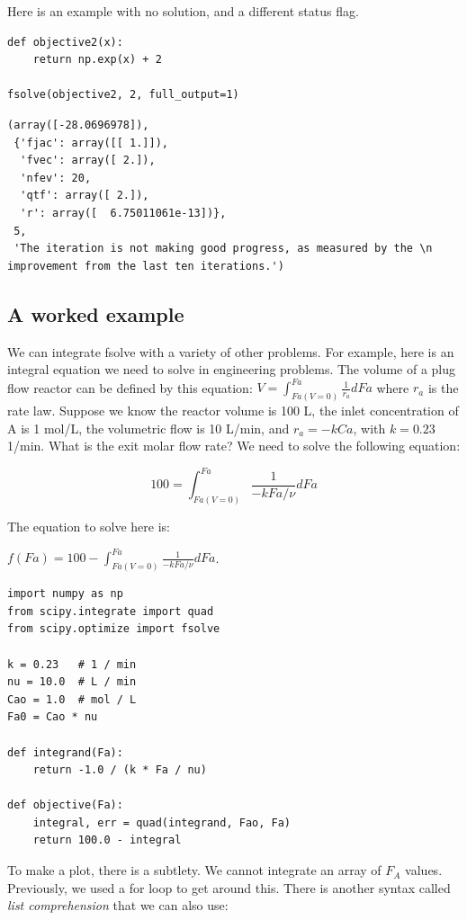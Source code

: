 \documentclass[11pt]{article}
\begin{document}
Here is an example with no solution, and a different status flag.

\begin{verbatim}
def objective2(x):
    return np.exp(x) + 2

fsolve(objective2, 2, full_output=1)
\end{verbatim}

\begin{verbatim}
(array([-28.0696978]),
 {'fjac': array([[ 1.]]),
  'fvec': array([ 2.]),
  'nfev': 20,
  'qtf': array([ 2.]),
  'r': array([  6.75011061e-13])},
 5,
 'The iteration is not making good progress, as measured by the \n  improvement from the last ten iterations.')
\end{verbatim}

\subsection{A worked example}
\label{sec:orgbc207c5}

We can integrate fsolve with a variety of other problems. For example, here is an integral equation we need to solve in engineering problems. The volume of a plug flow reactor can be defined by this equation: \(V = \int_{Fa(V=0)}^{Fa} \frac{1}{r_a} dFa\) where \(r_a\) is the rate law. Suppose we know the reactor volume is 100 L, the inlet concentration of A is 1 mol/L, the volumetric flow is 10 L/min, and \(r_a = -k Ca\), with \(k=0.23\) 1/min. What is the exit molar flow rate? We need to solve the following equation:

$$100 = \int_{Fa(V=0)}^{Fa} \frac{1}{-k Fa/\nu} dFa$$

The equation to solve here is:

\(f(Fa) = 100 - \int_{Fa(V=0)}^{Fa} \frac{1}{-k Fa/\nu} dFa\).

\begin{verbatim}
import numpy as np
from scipy.integrate import quad
from scipy.optimize import fsolve

k = 0.23   # 1 / min
nu = 10.0  # L / min
Cao = 1.0  # mol / L
Fa0 = Cao * nu

def integrand(Fa):
    return -1.0 / (k * Fa / nu)

def objective(Fa):
    integral, err = quad(integrand, Fao, Fa)
    return 100.0 - integral
\end{verbatim}

To make a plot, there is a subtlety. We cannot integrate an array of \(F_A\) values. Previously, we used a for loop to get around this. There is another syntax called \emph{list comprehension} that we can also use:
\end{document}
